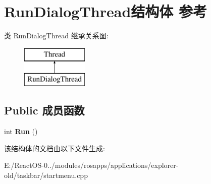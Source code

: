 \hypertarget{struct_run_dialog_thread}{}\section{Run\+Dialog\+Thread结构体 参考}
\label{struct_run_dialog_thread}
类 Run\+Dialog\+Thread 继承关系图\+:\begin{figure}[H]
\begin{center}
\leavevmode
\includegraphics[height=2.000000cm]{struct_run_dialog_thread}
\end{center}
\end{figure}
\subsection*{Public 成员函数}
\begin{DoxyCompactItemize}
\item 
\mbox{\label{struct_run_dialog_thread_a7c82112c0111f29759dc64524bec10ce}} 
int {\bfseries Run} ()
\end{DoxyCompactItemize}


该结构体的文档由以下文件生成\+:\begin{DoxyCompactItemize}
\item 
E\+:/\+React\+O\+S-\/0../modules/rosapps/applications/explorer-\/old/taskbar/startmenu.\+cpp\end{DoxyCompactItemize}
